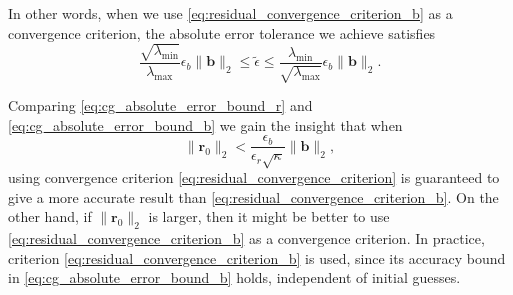In other words, when we use \cref{eq:residual_convergence_criterion_b} as a convergence criterion, the absolute error tolerance we achieve satisfies
\begin{equation}
  \frac{\sqrt{\lambda_{\text{min}}}}{\lambda_{\text{max}}}\epsilon_b\|\mathbf{b}\|_2 \leq \tilde{\epsilon} \leq \frac{\lambda_{\text{min}}}{\sqrt{\lambda_{\text{max}}}}\epsilon_b\|\mathbf{b}\|_2.
  \label{eq:cg_absolute_error_bound_b}
\end{equation}

Comparing \cref{eq:cg_absolute_error_bound_r} and \cref{eq:cg_absolute_error_bound_b} we gain the insight that when
\[
  \|\mathbf{r}_0\|_2 < \frac{\epsilon_b}{\epsilon_r\sqrt{\kappa}}\|\mathbf{b}\|_2,
\]
using convergence criterion \cref{eq:residual_convergence_criterion} is guaranteed to give a more accurate result than \cref{eq:residual_convergence_criterion_b}. On the other hand, if $\|\mathbf{r}_0\|_2$ is larger, then it might be better to use \cref{eq:residual_convergence_criterion_b} as a convergence criterion. In practice, criterion \cref{eq:residual_convergence_criterion_b} is used, since its accuracy bound in \cref{eq:cg_absolute_error_bound_b} holds, independent of initial guesses.

